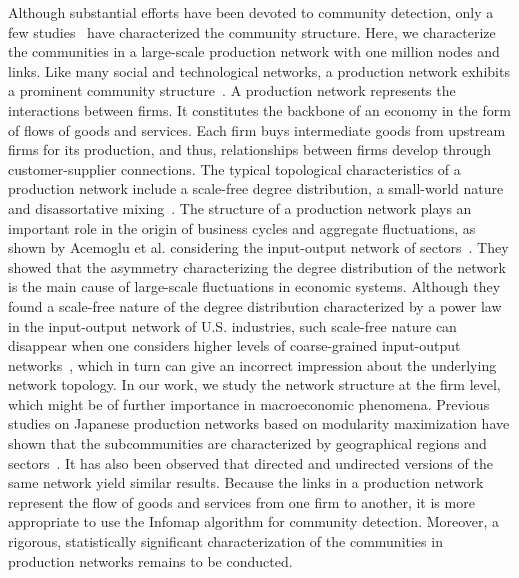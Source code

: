 \documentclass[pre,floatfix,twocolumn,showpacs,a4paper,nofootinbib]{revtex4}
\begin{document}
Although substantial efforts have been devoted to community detection, only a few studies~\cite{lancichinetti2010characterizing, tumminello2011community, tumminello2012identification, vitali2014community, marotta2015bank, marotta2016backbone} 
have characterized the community structure. Here, we characterize the communities in a large-scale production network with one million nodes and links.
Like many social and technological networks, a production network exhibits a prominent community structure~\cite{fujiwara2010large, iino2010community, iino2015community}. 
A production network represents the interactions between firms. It constitutes the backbone of an economy 
in the form of flows of goods and services. Each firm buys intermediate goods from upstream firms for its production, and 
thus, relationships between firms develop through customer-supplier connections.
The typical topological characteristics of a production network include
a scale-free degree distribution, a small-world nature and disassortative mixing~\cite{fujiwara2010large, mizuno2014structure}. 
The structure of a production network plays an important role in the origin of  business cycles and aggregate fluctuations, as shown by  Acemoglu et al. considering the input-output network of sectors~\cite{acemoglu2012network}. They showed that the asymmetry characterizing the  degree distribution
of the network is the main cause of  large-scale fluctuations in economic systems. Although they found a scale-free nature of 
the degree distribution characterized by a power law in the input-output network of  U.S. industries, such scale-free nature can
disappear when one considers higher levels of coarse-grained input-output networks~\cite{cerina2015world}, which in turn can give an incorrect impression about 
the underlying network topology. In our work, we study the network structure at the firm level, which might be of further importance
in macroeconomic phenomena.
Previous studies on Japanese production networks 
based on modularity maximization have shown that the subcommunities are characterized by geographical regions and sectors~\cite{iino2010community, iino2015community}.
It has also been observed that directed and undirected versions of the same network yield similar results. 
Because the links in a production network represent the flow of goods and services from one firm to another, it is more appropriate to use the Infomap algorithm for community detection.
Moreover, a rigorous, statistically significant characterization of the communities in production networks remains to be conducted.
\end{document}
